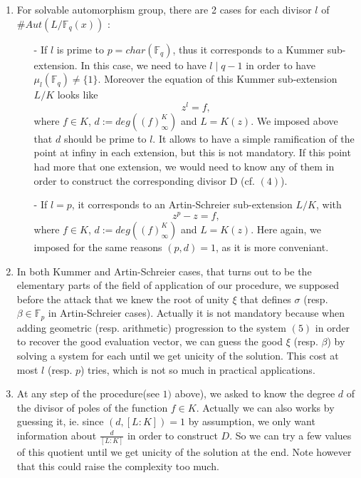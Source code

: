 \documentclass[10pt]{article}
\newcommand{\s}{\vspace{0.3cm}}
\newcommand{\fq}{\mathbb{F}_q}
\begin{document}
\begin{enumerate}
\item For solvable automorphism group, there are 2 cases for  each divisor $l$ of $\#Aut(L/\fq(x))$ :
\begin{itemize}
\item[-] If $l$ is prime to $p=char(\fq)$, thus it corresponds to a Kummer sub-extension. In this case, we need to have $l \mid q-1$ in order to have $\mu_l(\fq) \neq \{1\}$. Moreover the equation of this Kummer sub-extension $L/K$ looks like 
\[ z^l = f , \]
where $f \in K$, $d:=deg((f)^K_{\infty})$ and $L=K(z)$. We imposed above that $d$ should be prime to $l$. It allows to have a simple ramification of the point at infiny in each extension, but this is not mandatory. If this point had more that one extension, we would need to know any of them in order to construct the corresponding divisor D (cf. $(4)$).
\item[-] If $l=p$, it corresponds to an Artin-Schreier sub-extension $L/K$, with 
\[z^p-z = f, \]
where $f \in K$, $d:=deg((f)^K_{\infty})$ and $L=K(z)$. Here again, we imposed for the same reasons $(p,d)=1$, as it is more conveniant.
\end{itemize}
\item In both Kummer and Artin-Schreier cases, that turns out to be the elementary parts of the field of application of our procedure, we supposed before the attack that we knew the root of unity $\xi$ that defines $\sigma$ (resp. $\beta \in \mathbb{F}_p$ in Artin-Schreier cases). Actually it is not mandatory because when adding geometric (resp. arithmetic) progression to the system $(5)$ in order to recover the good evaluation vector, we can guess the good $\xi$ (resp. $\beta$) by solving a system for each until we get unicity of the solution. This cost at most $l$ (resp. $p$) tries, which is not so much in practical applications.

\item At any step of the procedure(see $1)$ above), we asked to know the degree $d$ of the divisor of poles of the function $f \in K$. Actually we can also works by guessing it, ie. since $(d,[L:K])=1$ by assumption, we only want information about $\frac{d}{[L:K]}$ in order to construct $D$. So we can try a few values of this quotient until we get unicity of the solution at the end. Note however that this could raise the complexity too much.
\end{enumerate}

\s
\end{document}
